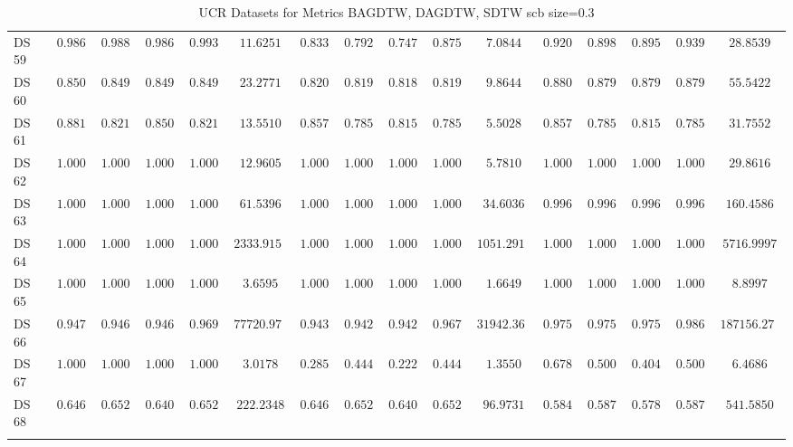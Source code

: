 {\begin{longtable}{|l|ccccc|ccccc|ccccc|}
		DS 59 & $\boldsymbol{0.9867}$ & $\boldsymbol{0.9886}$ & $\boldsymbol{0.9866}$ & $\boldsymbol{0.9932}$ & $11.6251$ & $0.8333$ & $0.7929$ & $0.7470$ & $0.8758$ & $7.0844$ & $0.9200$ & $0.8983$ & $0.8957$ & $0.9390$ & $28.8539$ \\
		DS 60 & $0.8507$ & $0.8498$ & $0.8499$ & $0.8498$ & $23.2771$ & $0.8209$ & $0.8195$ & $0.8189$ & $0.8195$ & $9.8644$ & $\boldsymbol{0.8806}$ & $\boldsymbol{0.8792}$ & $\boldsymbol{0.8793}$ & $\boldsymbol{0.8792}$ & $55.5422$ \\
		DS 61 & $\boldsymbol{0.8810}$ & $\boldsymbol{0.8214}$ & $\boldsymbol{0.8503}$ & $\boldsymbol{0.8214}$ & $13.5510$ & $0.8571$ & $0.7857$ & $0.8152$ & $0.7857$ & $5.5028$ & $0.8571$ & $0.7857$ & $0.8152$ & $0.7857$ & $31.7552$ \\
		DS 62 & $1.0000$ & $1.0000$ & $1.0000$ & $1.0000$ & $12.9605$ & $1.0000$ & $1.0000$ & $1.0000$ & $1.0000$ & $5.7810$ & $\boldsymbol{1.0000}$ & $\boldsymbol{1.0000}$ & $\boldsymbol{1.0000}$ & $\boldsymbol{1.0000}$ & $29.8616$ \\
		DS 63 & $1.0000$ & $1.0000$ & $1.0000$ & $1.0000$ & $61.5396$ & $\boldsymbol{1.0000}$ & $\boldsymbol{1.0000}$ & $\boldsymbol{1.0000}$ & $\boldsymbol{1.0000}$ & $34.6036$ & $0.9966$ & $0.9966$ & $0.9966$ & $0.9966$ & $160.4586$ \\
		DS 64 & $1.0000$ & $1.0000$ & $1.0000$ & $1.0000$ & $2333.9152$ & $1.0000$ & $1.0000$ & $1.0000$ & $1.0000$ & $1051.2914$ & $\boldsymbol{1.0000}$ & $\boldsymbol{1.0000}$ & $\boldsymbol{1.0000}$ & $\boldsymbol{1.0000}$ & $5716.9997$ \\
		DS 65 & $1.0000$ & $1.0000$ & $1.0000$ & $1.0000$ & $3.6595$ & $1.0000$ & $1.0000$ & $1.0000$ & $1.0000$ & $1.6649$ & $\boldsymbol{1.0000}$ & $\boldsymbol{1.0000}$ & $\boldsymbol{1.0000}$ & $\boldsymbol{1.0000}$ & $8.8997$ \\
		DS 66 & $0.9473$ & $0.9461$ & $0.9460$ & $0.9692$ & $77720.9701$ & $0.9437$ & $0.9425$ & $0.9423$ & $0.9671$ & $31942.3678$ & $\boldsymbol{0.9759}$ & $\boldsymbol{0.9757}$ & $\boldsymbol{0.9759}$ & $\boldsymbol{0.9861}$ & $187156.2735$ \\
		DS 67 & $1.0000$ & $1.0000$ & $1.0000$ & $1.0000$ & $3.0178$ & $0.2857$ & $0.4444$ & $0.2222$ & $0.4444$ & $1.3550$ & $0.6786$ & $0.5000$ & $0.4043$ & $0.5000$ & $6.4686$ \\
		DS 68 & $0.6462$ & $0.6525$ & $0.6407$ & $0.6525$ & $222.2348$ & $\boldsymbol{0.6462}$ & $\boldsymbol{0.6525}$ & $\boldsymbol{0.6407}$ & $\boldsymbol{0.6525}$ & $96.9731$ & $0.5846$ & $0.5875$ & $0.5782$ & $0.5875$ & $541.5850$ \\
		\hline
		\caption{UCR Datasets for Metrics BAGDTW, DAGDTW, SDTW \gls{scb} size=0.3}
		\label{tab:UCR_bagdtw-dagdtw-sdtw_scb_size=0.3}
	\end{longtable}
}
